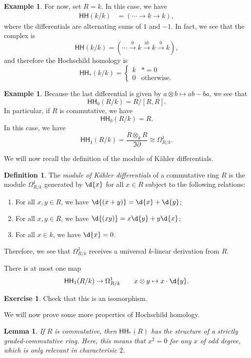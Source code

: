 \documentclass[10pt]{amsart}
\newtheorem{lem}[thm]{Lemma}
\theoremstyle{definition}
\newtheorem{defn}[thm]{Definition}
\newtheorem{exm}[thm]{Example}
\newtheorem{exer}[thm]{Exercise}
\theoremstyle{remark}
\theoremstyle{plain}
\theoremstyle{definition}
\theoremstyle{remark}
\newcommand{\mr}[1]{\mathrm{#1}}
\newcommand{\ms}[1]{\mathsf{#1}}
\newcommand{\1}{\mathbf{1}}
\newcommand{\2}{\mathbf{2}}
\newcommand{\3}{\mathbf{3}}
\newcommand{\HH}{\ms{HH}}
\begin{document}
\begin{exm}
    For now, set \(R=k\). In this case, we have
    \begin{align*}
        \HH(k/k) &= (\cdots \to k \to k),
    \end{align*}
    where the differentials are alternating sums of $1$ and $-1$. In fact, we see that the complex is
    \[ \HH(k/k) = (\cdots \xrightarrow{0} k \xrightarrow{\mr{id}} k \xrightarrow{0}k), \]
    and therefore the Hochschild homology is
    \[ \HH_*(k/k) = \begin{cases}
        k & *=0 \\
        0 & \text{otherwise}.
    \end{cases} \]
\end{exm}

\begin{exm}
    Because the last differential is given by $a \otimes b \mapsto ab - ba$, we see that
    \[ \HH_0(R/k) = R/[R,R]. \]
    In particular, if $R$ is commutative, we have
    \[ \HH_0(R/k) = R. \]
    In this case, we have
    \[ \HH_1(R/k) = \frac {R \otimes_k R}{\Im \partial} \cong \Omega^1_{R/k}. \]
\end{exm}

We will now recall the definition of the module of K\"ahler differentials.
\begin{defn}
    The \textit{module of K\"ahler differentials} of a commutative ring $R$ is the module $\Omega^1_{R/k}$ generated by $\d{x}$ for all $x \in R$ subject to the following relations:
    \begin{enumerate}
        \item For all $x, y \in R$, we have $\d{(x+y)} = \d{x} + \d{y}$;
        \item For all $x,y \in R$, we have $\d{(xy)} = x \d{y} + y \d{x}$;
        \item For all $x \in k$, we have $\d{x} = 0$.
    \end{enumerate}
    Therefore, we see that $\Omega^1_{R/k}$ receives a universal $k$-linear derivation from $R$.
\end{defn}

There is at most one map
\[ \HH_1(R/k) \to \Omega^1_{R/k} \qquad x \otimes y \mapsto x \cdot \d{y}. \]
\begin{exer}
    Check that this is an isomorphism.
\end{exer}

We will now prove some more properties of Hochschild homology.
\begin{lem}
    If $R$ is commutative, then \(\HH_*(R)\) has the structure of a strictly graded-commutative ring. Here, this means that \(x^2 = 0\) for any \(x\) of odd degree, which is only relevant in characterisic $2$.
\end{lem}
\end{document}
